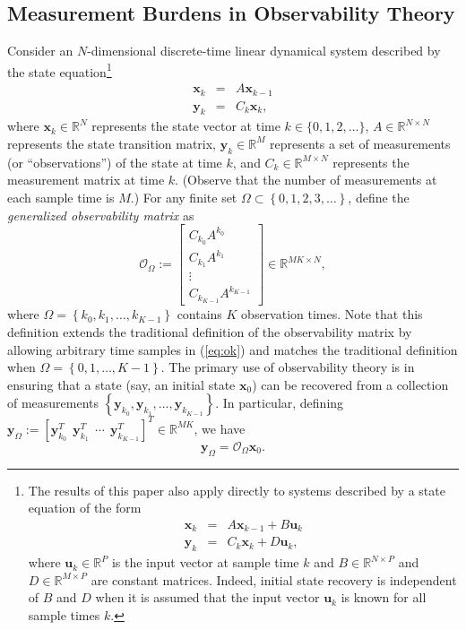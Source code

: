 \documentclass[11pt,draftcls,onecolumn]{IEEEtran}
\def\real    { \mathbb{R} }
\newcommand{\vc}[1]{\boldsymbol{#1}}
\def\real    { \mathbb{R} }
\begin{document}
\subsection{Measurement Burdens in Observability Theory}

Consider an $N$-dimensional discrete-time linear dynamical system described by the state equation\footnote{The results of this paper also apply directly to systems described by a state equation of the form
\begin{equation*}
\begin{array}{rcl}
\vc{x}_k &=& A \vc{x}_{k-1} + B\vc{u}_k\\[1mm]
\vc{y}_k &=& C_k \vc{x}_k+ D\vc{u}_k,
\end{array}
\end{equation*}
where $\vc{u}_k \in \real^P$ is the input vector at sample time $k$ and $B \in \real^{N \times P}$ and $D \in \real^{M \times P}$ are constant matrices. 
Indeed, initial state recovery is independent of $B$ and $D$ when it is assumed that the input vector $\vc{u}_k$ is known for all sample times $k$.
}
\begin{equation}
\begin{array}{rcl}
\vc{x}_k &=& A \vc{x}_{k-1} \\[1mm]
\vc{y}_k &=& C_k \vc{x}_k,
\end{array}
\label{eq:sys}
\end{equation}
where $\vc{x}_k \in \real^N$ represents the state vector at time $k \in \{0,1,2,\dots\}$, $A \in \real^{N \times N}$ represents the state transition matrix, $\vc{y}_k \in \real^M$ represents a set of measurements (or ``observations'') of the state at time $k$, and $C_k \in \real^{M \times N}$ represents the measurement matrix at time $k$. (Observe that the number of measurements at each sample time is $M$.)
For any finite set $\Omega \subset \left\{0, 1, 2, 3, \dots \right\}$, define the {\em generalized observability matrix} as
\begin{equation}
\mathcal{O}_{\Omega} := \left[ \begin{array}{c} C_{k_0}A^{k_0} \\ C_{k_1} A^{k_1} \\ \vdots \\ C_{k_{K-1}} A^{k_{K-1}} \end{array} \right] \in \real^{MK \times N},
\label{eq:ok}
\end{equation}
where $\Omega = \left\{k_0, k_1, \dots, k_{K-1}\right\}$ contains $K$ observation times. Note that this definition extends the traditional definition of the observability matrix by allowing arbitrary time samples in (\ref{eq:ok}) and matches the traditional definition when $\Omega = \left\{0, 1, \dots, K-1\right\}$. The primary use of observability theory is in ensuring that a state (say, an initial state $\vc{x}_0$) can be recovered from a collection of measurements $\left\{\vc{y}_{k_0}, \vc{y}_{k_1}, \dots, \vc{y}_{k_{K-1}}\right\}$. In particular, defining $\vc{y}_{\Omega} := \left[\vc{y}^T_{k_0}~~\vc{y}^T_{k_1}~~\cdots~~\vc{y}^T_{k_{K-1}} \right]^T \in \real^{MK}$,
we have
\begin{equation}
\vc{y}_{\Omega} = \mathcal{O}_{\Omega}\vc{x}_0.
\label{eq:matvec1}
\end{equation}
\end{document}
